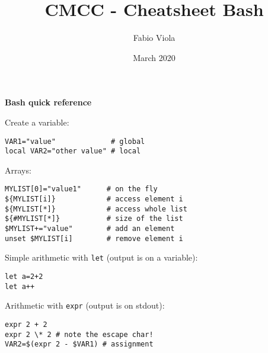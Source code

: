 \documentclass[twocolumn,8pt]{article}
\title{CMCC - Cheatsheet Bash}
\author{Fabio Viola}
\date{March 2020}
\begin{document}

\LARGE \textbf{Bash quick reference} \normalsize  



\begin{mdframed}[frametitle=Variables]
Create a variable:
\begin{lstlisting}
VAR1="value"             # global
local VAR2="other value" # local
\end{lstlisting}
Arrays:
\begin{lstlisting}
MYLIST[0]="value1"      # on the fly
${MYLIST[i]}            # access element i
${MYLIST[*]}            # access whole list
${#MYLIST[*]}           # size of the list
$MYLIST+="value"        # add an element
unset $MYLIST[i]        # remove element i
\end{lstlisting}
\end{mdframed}


\begin{mdframed}[frametitle=Arithmetic]
Simple arithmetic with \texttt{let} (output is on a variable):
\begin{lstlisting}
let a=2+2
let a++
\end{lstlisting}

Arithmetic with \texttt{expr} (output is on stdout):
\begin{lstlisting}
expr 2 + 2
expr 2 \* 2 # note the escape char!
VAR2=$(expr 2 - $VAR1) # assignment
\end{lstlisting}
\end{mdframed}

\end{document}
